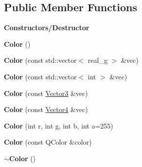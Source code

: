 \subsection*{Public Member Functions}
\begin{Indent}\textbf{ Constructors/\+Destructor}\par
\begin{DoxyCompactItemize}
\item 
\mbox{\label{classrev_1_1_color_ab12969a8264c8c9b8ff7069580c74132}} 
{\bfseries Color} ()
\item 
\mbox{\label{classrev_1_1_color_a388d196ba335ef300134284cfc21ccc2}} 
{\bfseries Color} (const std\+::vector$<$ real\+\_\+g $>$ \&vec)
\item 
\mbox{\label{classrev_1_1_color_a973f54b5da1e519e0d174530b747ec42}} 
{\bfseries Color} (const std\+::vector$<$ int $>$ \&vec)
\item 
\mbox{\label{classrev_1_1_color_afeaba3a53f20509c6c9dfdf1cfe1e69f}} 
{\bfseries Color} (const \mbox{\hyperlink{classrev_1_1_vector}{Vector3}} \&vec)
\item 
\mbox{\label{classrev_1_1_color_a07b39a22ce0ad97644a6fe8702c9aa1b}} 
{\bfseries Color} (const \mbox{\hyperlink{classrev_1_1_vector}{Vector4}} \&vec)
\item 
\mbox{\label{classrev_1_1_color_acb1cc0fecf0bf60141d5ea34c4fab252}} 
{\bfseries Color} (int r, int g, int b, int a=255)
\item 
\mbox{\label{classrev_1_1_color_a3a5de98033b36e0ecb80ec402ed915d7}} 
{\bfseries Color} (const Q\+Color \&color)
\item 
\mbox{\label{classrev_1_1_color_a4bf9869d1776801e631fca17bfddb353}} 
{\bfseries $\sim$\+Color} ()
\end{DoxyCompactItemize}
\end{Indent}
